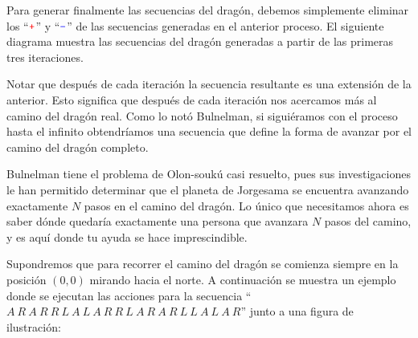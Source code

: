 \documentclass{oci}
\renewcommand{\u}{{\color{red}\texttt{+}}}
\renewcommand{\d}{{\color{blue}\texttt{-}}}
\begin{document}
Para generar finalmente las secuencias del dragón, debemos simplemente eliminar los ``$\u$'' y ``$\d$'' de las secuencias generadas en el anterior proceso.
El siguiente diagrama muestra las secuencias del dragón generadas a partir de las primeras tres iteraciones.
\begin{center}
\scalebox{0.8}
{ 
}
\end{center}

Notar que después de cada iteración la secuencia resultante es una extensión de la anterior.
Esto significa que después de cada iteración nos acercamos más al camino del dragón real. Como lo notó Bulnelman, si siguiéramos con el proceso hasta el infinito obtendríamos una secuencia que define la forma de avanzar por el camino del dragón completo.

Bulnelman tiene el problema de Olon-soukú casi resuelto, pues sus investigaciones le han permitido determinar que el planeta de Jorgesama se encuentra avanzando exactamente $N$ pasos en el camino del dragón. Lo único que necesitamos ahora es saber dónde quedaría exactamente una persona que avanzara $N$ pasos del camino, y es aquí donde tu ayuda se hace imprescindible.


Supondremos que para recorrer el camino del dragón se comienza siempre en la posición $(0,0)$ mirando hacia el norte.
A continuación se muestra un ejemplo donde se ejecutan las acciones para la secuencia ``$A\ R\ A\ R\ R\ L\ A\ L\ A\ R\ R\ L\ A\ R\ A\ R\ L\ L\ A\ L\ A\ R$'' junto a una figura de ilustración:
\\
\end{document}
